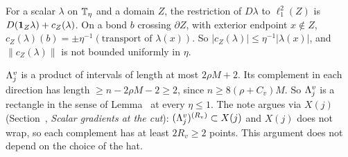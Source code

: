 \begin{detail}\label{d9:cut-par}
For a scalar $\lambda$ on $\mathbb T_\eta$ and a domain $Z$, the restriction of $D\lambda$ to $\ell^2_1(Z)$ is $D(\mathbf 1_Z\lambda)+c_Z(\lambda)$. On a bond $b$ crossing $\partial Z$, with exterior endpoint $x\notin Z$, $c_Z(\lambda)(b)=\pm\eta^{-1}(\text{transport of }\lambda(x))$. So $|c_Z(\lambda)|\le\eta^{-1}|\lambda(x)|$, and $\|c_Z(\lambda)\|$ is not bounded uniformly in $\eta$.

$\Lambda^v_j$ is a product of intervals of length at most $2\rho M+2$. Its complement in each direction has length $\ge n-2\rho M-2\ge2$, since $n\ge8(\rho+C_v)M$. So $\Lambda^v_j$ is a rectangle in the sense of Lemma~ at every $\eta\le1$. The note argues via $X(j)$ (Section~, \emph{Scalar gradients at the cut}): $(\Lambda^v_j)^{(R_v)}\subset X(j)$ and $X(j)$ does not wrap, so each complement has at least $2R_v\ge2$ points. This argument does not depend on the choice of the hat.
\end{detail}


